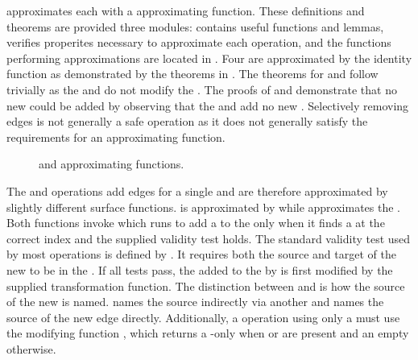 \TMmodelName{} approximates each \TMop{} with a \TMdirAcc{} approximating function.
These definitions and theorems are provided three modules: \COQDirectAccess{} contains useful functions and lemmas, \COQDirectAccessSemantics{} verifies properites necessary to approximate each operation, and the functions performing approximations are located in \COQDirectAccessApprox{}.
Four \TMops{} are approximated by the identity function as demonstrated by the theorems in .
The theorems for \COQdirAccRead{} and \COQdirAccWrite{} follow trivially as the \TMread{} and \TMwrite{} \TMops{} do not modify the \TMsystemState{}.
The proofs of \COQdirAccRevoke{} and \COQdirAccDestroy{} demonstrate that no new \TMaccessEdges{} could be added by observing that the \TMrevoke{} and \TMdestroy{} \TMops{} add no new \TMcaps{}.
Selectively removing edges is not generally a safe operation as it does not generally satisfy the requirements for an approximating function.

\begin{figure}
  \COQDOCfetchDepAG{}
  \COQDOCstoreDepAG{}
  \COQDOCagAddCapByIndirectIndex{}
  \COQDOCagPushCapByIndices{}
  \COQDOCdirAccMDepFetch{}
  \COQDOCdirAccMDepStore{}  
  \caption{\xmakefirstuc{\TMfetch{}} and \TMstore{} approximating functions.\label{fig:safety:fetchDepAG}\label{fig:safety:storeDepAG}}
\end{figure}

The \COQfetch{} and \COQstore{} operations add edges for a single \TMcap{} and are therefore  approximated by slightly different surface functions.
\xmakefirstuc{\COQstore{}} is approximated by \COQagPushCapByIndices{} while \COQagAddCapByIndirectIndex{} approximates the \COQfetch{} \TMop{}.
Both functions invoke \COQagAddCapByObjIndex{} which runs \COQagAddCap{} to add a \TMcap{} to the \TMaccessGraph{} only when it finds a \TMcap{} at the correct index and the supplied validity test holds.
The standard validity test used by most operations is defined by \COQagAddCapValidStd{}.
It requires both the source and target of the new \TMaccessEdge{} to be \TMalive{} in the \TMsystemState{}.
If all tests pass, the \TMcap{} added to the \TMaccessGraph{} by \COQagAddCap{} is first modified by the supplied \TMcap{} transformation function.
The distinction between \COQagAddCapByIndirectIndex{} and \COQagPushCapByIndices{} is how the source of the new \TMaccessEdge{} is named.
\COQagAddCapByIndirectIndex{} names the source indirectly via another \TMcap{} and \COQagPushCapByIndices{} names the source of the new edge directly.
Additionally, a \TMfetch{} operation using only a \COQwk{} \TMaccessRight{} must use the modifying function \COQweaken{}, which returns a \COQwk{}-only \TMcap{} when \COQwk{} or \COQrd{} are present and an empty \TMaccessRightSet{} otherwise.

